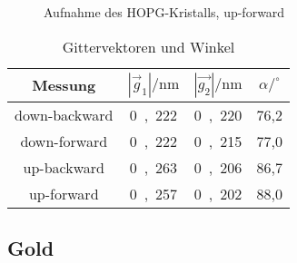 \begin{figure}
	\centering
	\resizebox{12cm}{!}{
		
	}
	\caption{Aufnahme des HOPG-Kristalls, up-forward}
	\label{fig:up-forward}
\end{figure}

\begin{table}[H]
	\begin{center}
		\begin{tabular}{c c c c}
			\toprule
			Messung & $|\vec{g}_1| / \mathrm{nm}$ & $|\vec{g_2}| / \mathrm{nm}$ & $\alpha /^\circ $ \\
			\midrule
			down-backward & \si{0,222} & \si{0,220} & 76,2 \\
			down-forward & \si{0,222} & \si{0,215} & 77,0 \\
			up-backward & \si{0,263} & \si{0,206} & 86,7 \\
			up-forward & \si{0,257} & \si{0,202} & 88,0 \\
			\bottomrule
		\end{tabular}
		\caption{Gittervektoren und Winkel}
		\label{fig:t1}
	\end{center}
\end{table}

\subsection{Gold}